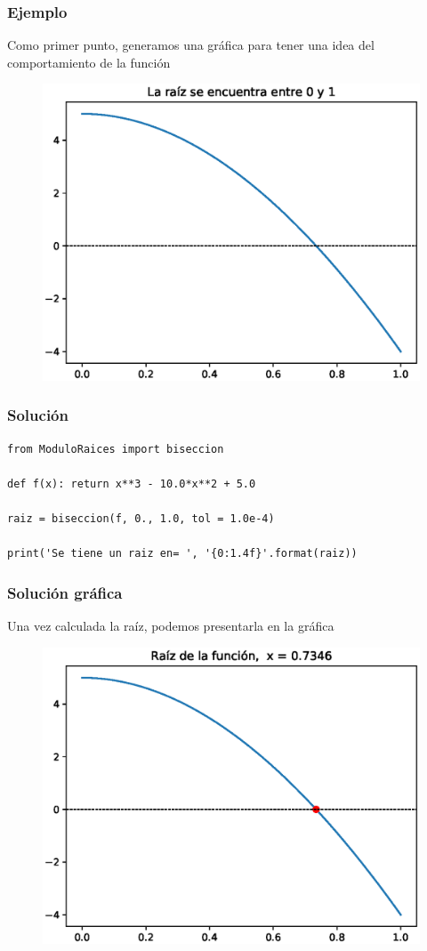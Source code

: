 \begin{frame}[fragile]
\frametitle{Ejemplo}
Como primer punto, generamos una gráfica para tener una idea del comportamiento de la función
\begin{figure}
	\centering
	\includegraphics[scale=0.5]{Imagenes/Ejercicio_4_2_Libro.eps}
\end{figure}
\end{frame}
\begin{frame}
\frametitle{Solución}
\begin{lstlisting}[caption=Solución al ejercicio, style=codigopython]
from ModuloRaices import biseccion

def f(x): return x**3 - 10.0*x**2 + 5.0

raiz = biseccion(f, 0., 1.0, tol = 1.0e-4)

print('Se tiene un raiz en= ', '{0:1.4f}'.format(raiz))
\end{lstlisting}
\end{frame}
\begin{frame}[fragile]
\frametitle{Solución gráfica}
Una vez calculada la raíz, podemos presentarla en la gráfica
\begin{figure}
	\centering
	\includegraphics[scale=0.4]{Imagenes/Ejercicio_4_2_02_Libro.eps}
\end{figure}
\end{frame}
